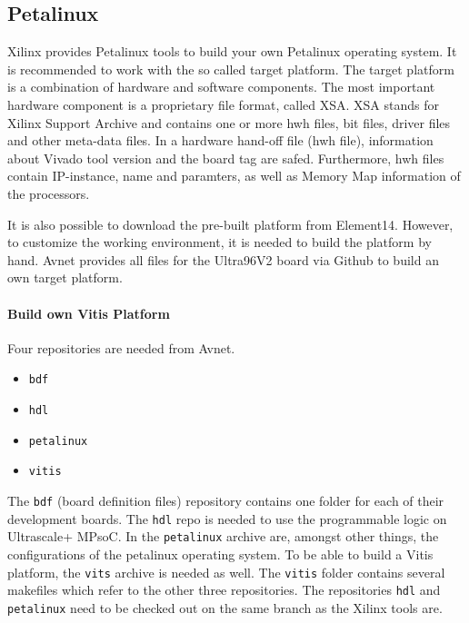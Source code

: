 \subsection{Petalinux}
\label{subsec:embedded_platform:operating_systems:petalinux}

Xilinx provides Petalinux tools to build your own Petalinux operating system.
It is recommended to work with the so called target platform.
The target platform is a combination of hardware and software components.
The most important hardware component is a proprietary file format, called XSA.
XSA stands for Xilinx Support Archive and contains one or more hwh files, bit files, driver files and other meta-data files.
In a hardware hand-off file (hwh file), information about Vivado tool version and the board tag are safed.
Furthermore, hwh files contain IP-instance, name and paramters, as well as Memory Map information of the processors.

It is also possible to download the pre-built platform from Element14.
However, to customize the working environment, it is needed to build the platform by hand.
Avnet provides all files for the Ultra96V2 board via Github to build an own target platform.

\paragraph{Build own Vitis Platform}
Four repositories are needed from Avnet.
\begin{itemize}
	\item \texttt{bdf}
	\item \texttt{hdl}
	\item \texttt{petalinux}
	\item \texttt{vitis}
\end{itemize}

The \texttt{bdf} (board definition files) repository contains one folder for each of their development boards.
The \texttt{hdl} repo is needed to use the programmable logic on Ultrascale+ MPsoC.
In the \texttt{petalinux} archive are, amongst other things, the configurations of the petalinux operating system.
To be able to build a Vitis platform, the \texttt{vits} archive is needed as well.
The \texttt{vitis} folder contains several makefiles which refer to the other three repositories.
The repositories \texttt{hdl} and \texttt{petalinux} need to be checked out on the same branch as the Xilinx tools are.

